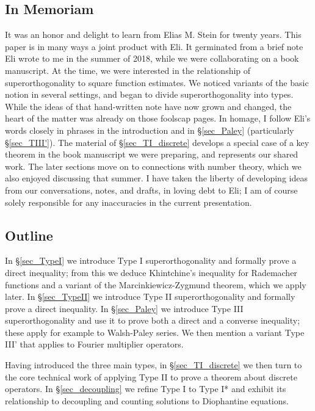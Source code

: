 \documentclass[oneside,11pt]{amsart}
\begin{document}
\subsection*{In Memoriam}
It was an honor and delight to learn from   Elias M. Stein  for twenty years. This paper is in many ways a joint product with Eli. It germinated from a brief note Eli wrote to me in the summer of 2018, while we were collaborating on a book manuscript.  At the time, we were interested in the relationship of superorthogonality  to square function estimates.  We noticed  variants of the basic notion   in several settings, and began to divide  superorthogonality into types.
 While the ideas of that hand-written note have now grown and changed, the heart of the matter was already on those foolscap pages. In homage, I follow Eli's words closely in  phrases in the introduction and  in \S \ref{sec_Paley} (particularly \S \ref{sec_TIII'}). The material of \S \ref{sec_TI_discrete} develops a special case of a key theorem in  the book manuscript we were preparing, and represents our shared work. The later sections   move on to connections with number theory, which we also enjoyed discussing that summer.   I have taken the liberty of developing ideas from our conversations, notes, and drafts, in loving debt to Eli; I am of course solely responsible for any  inaccuracies in the current presentation. 



 
\subsection*{Outline}


In  \S \ref{sec_TypeI} we introduce Type I superorthogonality and formally prove a direct inequality; from this we deduce Khintchine's inequality for Rademacher functions and a variant of the Marcinkiewicz-Zygmund theorem, which we apply later.
In  \S \ref{sec_TypeII} we introduce Type II superorthogonality and formally prove a direct inequality. 
In  \S \ref{sec_Paley} we introduce Type III superorthogonality and use it to prove both a direct and  a converse inequality; these apply for example to  Walsh-Paley series. We then mention a variant Type III' that applies to Fourier multiplier operators. %

Having introduced the three main types, in  \S \ref{sec_TI_discrete} we then turn to the core technical work of applying Type II to prove a  theorem about discrete operators.
In \S \ref{sec_decoupling} we refine Type I to Type I* and  exhibit its relationship to decoupling and counting solutions to Diophantine equations.
\end{document}
